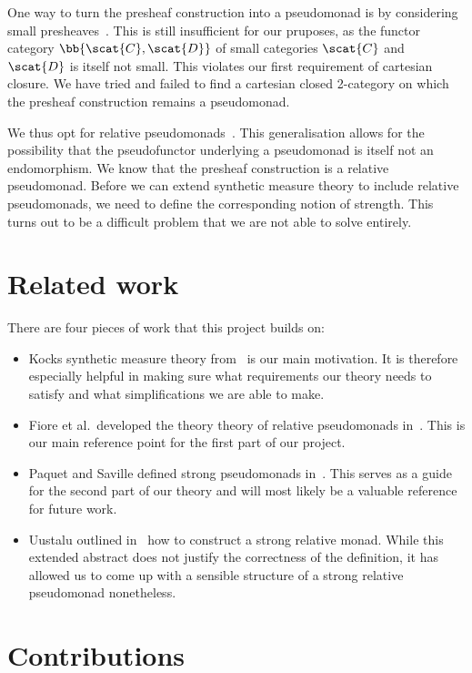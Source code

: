 One way to turn the presheaf construction into a pseudomonad is by considering
small presheaves~\cite{day2007}. This is still insufficient for our pruposes,
as the functor category $\bb{\scat{C},\scat{D}}$ of small categories $\scat{C}$
and $\scat{D}$ is itself not small. This violates our first requirement of
cartesian closure. We have tried and failed to find a cartesian closed
2-category on which the presheaf construction remains a pseudomonad.

We thus opt for relative pseudomonads~\cite{fiore2017}. This generalisation
allows for the possibility that the pseudofunctor underlying a pseudomonad is
itself not an endomorphism. We know that the presheaf construction is a
relative pseudomonad. Before we can extend synthetic measure theory to include
relative pseudomonads, we need to define the corresponding notion of strength.
This turns out to be a difficult problem that we are not able to solve
entirely.

\section{Related work}

There are four pieces of work that this project builds on:

\begin{itemize}
  \item Kocks synthetic measure theory from~\cite{kock2011} is our main motivation. It
    is therefore especially helpful in making sure what requirements our theory needs
    to satisfy and what simplifications we are able to make.
  \item Fiore et al.~developed the theory theory of relative pseudomonads in~\cite{fiore2017}.
    This is our main reference point for the first part of our project.
  \item  Paquet and Saville defined strong pseudomonads in~\cite{saville2023}. This
    serves as a guide for the second part of our theory and will most likely be a
    valuable reference for future work.
  \item Uustalu outlined in~\cite{tarmo} how to construct a strong relative monad. While
    this extended abstract does not justify the correctness of the definition, it has allowed
    us to come up with a sensible structure of a strong relative pseudomonad nonetheless.
\end{itemize}

\section{Contributions}

